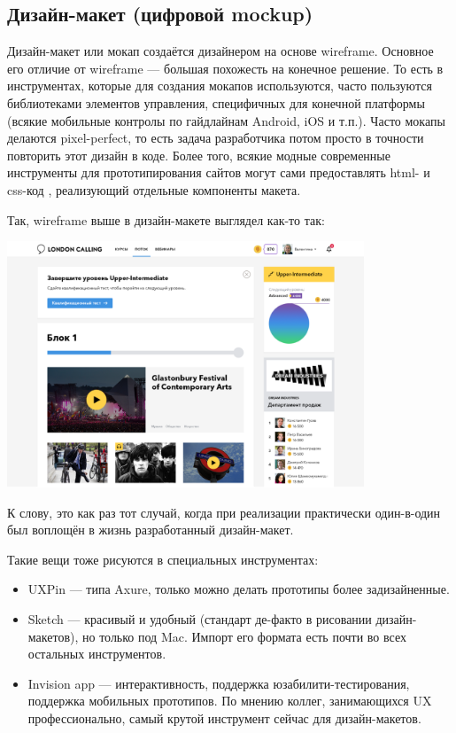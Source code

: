 \documentclass{../../text-style}
\begin{document}
\subsection{Дизайн-макет (цифровой mockup)}

Дизайн-макет или мокап создаётся дизайнером на основе wireframe. Основное его отличие от wireframe --- большая похожесть на конечное решение. То есть в инструментах, которые для создания мокапов используются, часто пользуются библиотеками элементов управления, специфичных для конечной платформы (всякие мобильные контролы по гайдлайнам Android, iOS и т.п.). Часто мокапы делаются pixel-perfect, то есть задача разработчика потом просто в точности повторить этот дизайн в коде. Более того, всякие модные современные инструменты для прототипирования сайтов могут сами предоставлять html- и css-код , реализующий отдельные компоненты макета.

Так, wireframe выше в дизайн-макете выглядел как-то так:

\begin{center}
    \includegraphics[width=0.8\textwidth]{designLayout.png}
\end{center}

К слову, это как раз тот случай, когда при реализации практически один-в-один был воплощён в жизнь разработанный дизайн-макет.

Такие вещи тоже рисуются в специальных инструментах:

\begin{itemize}
    \item UXPin ---  типа Axure, только можно делать прототипы более задизайненные.
    \item Sketch --- красивый и удобный (стандарт де-факто в рисовании дизайн-макетов), но только под Mac. Импорт его формата есть почти во всех остальных инструментов.
    \item Invision app --- интерактивность, поддержка юзабилити-тестирования, поддержка мобильных прототипов. По мнению коллег, занимающихся UX профессионально, самый крутой инструмент сейчас для дизайн-макетов.
\end{itemize}
\end{document}
